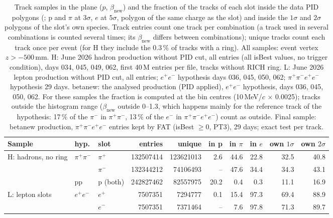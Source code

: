 \begin{table}[H]
\centering
\caption{Track samples in the plane ($p$, $\beta_{\mathrm{new}}$) and the fraction of the tracks of each slot inside the data PID polygons (; p and $\pi$ at $3\sigma$, $e$ at $5\sigma$, polygon of the same charge as the slot) and inside the $1\sigma$ and $2\sigma$ polygons of the slot's own species. Track entries count one track per combination (a track used in several combinations is counted several times; its $\beta_{\mathrm{new}}$ differs between combinations); unique tracks count each track once per event (for H they include the 0.3\,\% of tracks with a ring). All samples: event vertex $z>-500$\,mm. H: June 2026 hadron production without PID cut, all entries (all isBest values, no trigger condition), days 034, 045, 049, 062, first 40\,M entries per file, tracks without RICH ring. L: June 2026 lepton production without PID cut, all entries; $e^+e^-$ hypothesis days 036, 045, 050, 062; $\pi^+\pi^-e^+e^-$ hypothesis 29 days. betanew: the analysed production (PID applied), $e^+e^-$ hypothesis, days 036, 045, 050, 062. For these samples the fraction is computed at the bin centres (10\,MeV/$c$ $\times$ 0.0025); tracks outside the histogram range ($\beta_{\mathrm{new}}$ outside 0--1.3, which happens mainly for the reference track of the hypothesis: 17\,\% of the $\pi^-$ in $\pi^+\pi^-$, 13\,\% of the $e^-$ in $\pi^+\pi^-e^+e^-$) count as outside. Final sample: betanew production, $\pi^+\pi^-e^+e^-$ entries kept by FAT (isBest $\geq 0$, PT3), 29 days; exact test per track.}
\label{tab:pid_samples}
\scriptsize
\setlength{\tabcolsep}{3pt}
\begin{tabular}{@{}l l l r r r r r r r@{}}
\toprule
Sample & hyp. & slot & entries & unique & in p & in $\pi$ & in $e$ & own $1\sigma$ & own $2\sigma$ \\
\midrule
H: hadrons, no ring & $\pi^+\pi^-$ & $\pi^+$ & 132507414 & 123621013 & 2.6 & 44.6 & 22.8 & 32.5 & 40.8 \\
 &  & $\pi^-$ & 132344212 & 74106493 & -- & 47.6 & 34.4 & 34.3 & 43.1 \\
 & pp & p (both) & 242827462 & 82557975 & 20.2 & 0.4 & 0.3 & 11.1 & 16.9 \\
\midrule
L: lepton slots & $e^+e^-$ & $e^+$ & 7507351 & 7294777 & 0.1 & 15.4 & 97.3 & 69.4 & 88.9 \\
 &  & $e^-$ & 7507351 & 7371464 & -- & 7.6 & 97.8 & 71.3 & 89.7 \\

\end{tabular}
\end{table}
